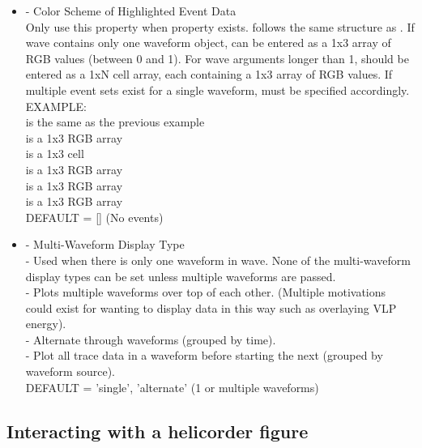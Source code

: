 \documentclass[11pt]{article}
\begin{document}
\begin{itemize}
\item {} - Color Scheme of Highlighted Event Data\\
Only use this property when  property exists.  follows the same structure as . If wave contains only one waveform object,  can be entered as a 1x3 array of RGB values (between 0 and 1). For wave arguments longer than 1,  should be entered as a 1xN cell array, each containing a 1x3 array of RGB values. If multiple event sets exist for a single waveform,  must be specified accordingly.\\
EXAMPLE: \\
 is the same as the previous example\\
 is a 1x3 RGB array\\
 is a 1x3 cell\\
 is a 1x3 RGB array\\
 is a 1x3 RGB array\\
 is a 1x3 RGB array\\
DEFAULT = [] (No events)

\item {} - Multi-Waveform Display Type\\
 - Used when there is only one waveform in wave. None of the multi-waveform display types can be set unless multiple waveforms are passed.\\
 - Plots multiple waveforms over top of each other. (Multiple motivations could exist for wanting to display data in this way such as overlaying VLP energy).\\
 - Alternate through waveforms (grouped by time).\\
 - Plot all trace data in a waveform before starting the next (grouped by waveform source).\\
DEFAULT = 'single', 'alternate' (1 or multiple waveforms)

\end{itemize}

\clearpage

\subsection{Interacting with a helicorder figure}
\end{document}
